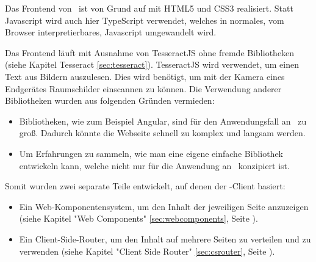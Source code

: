 Das Frontend von \ZELIA\ ist von Grund auf mit HTML5 und CSS3 realisiert. Statt Javascript wird auch hier TypeScript verwendet, welches in normales, vom Browser interpretierbares, Javascript umgewandelt wird. 

Das Frontend läuft mit Ausnahme von TesseractJS ohne fremde Bibliotheken (siehe Kapitel Tesseract \ref{sec:tesseract}). TesseractJS wird verwendet, um einen Text aus Bildern auszulesen. Dies wird benötigt, um mit der Kamera eines Endgerätes Raumschilder einscannen zu können. Die Verwendung anderer Bibliotheken wurden aus folgenden Gründen vermieden:
\begin{itemize}
    \item Bibliotheken, wie zum Beispiel Angular, sind für den Anwendungsfall an \ZELIA\ zu groß. Dadurch könnte die Webseite schnell zu komplex und langsam werden.
    \item Um Erfahrungen zu sammeln, wie man eine eigene einfache Bibliothek entwickeln kann, welche nicht nur für die Anwendung an \ZELIA\ konzipiert ist.
\end{itemize}

\begin{minipage}{\textwidth}
    Somit wurden zwei separate Teile entwickelt, auf denen der \ZELIA-Client basiert:
    
    \begin{itemize}
        \item Ein Web-Komponentensystem, um den Inhalt der jeweiligen Seite anzuzeigen (siehe Kapitel "Web Components" \ref{sec:webcomponents}, Seite \pageref{sec:webcomponents}).
        \item Ein Client-Side-Router, um den Inhalt auf mehrere Seiten zu verteilen und zu verwenden (siehe Kapitel "Client Side Router" \ref{sec:csrouter}, Seite \pageref{sec:csrouter}).
    \end{itemize}
\end{minipage}

